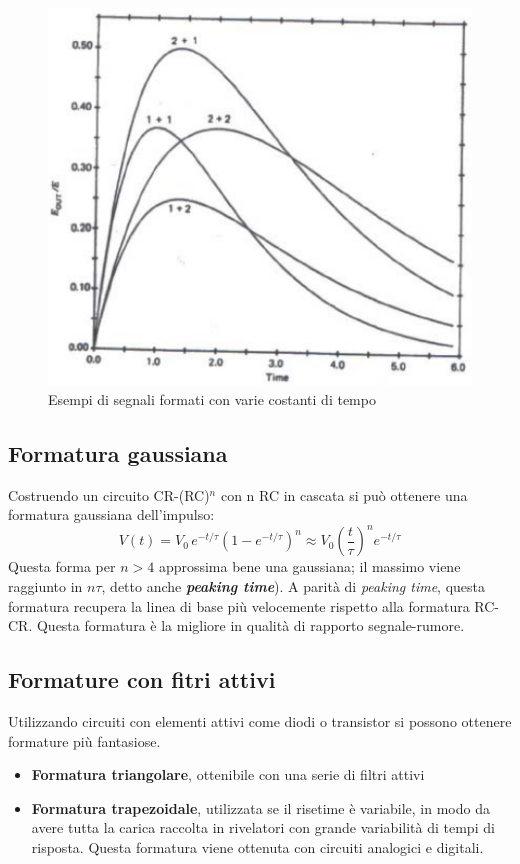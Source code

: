 \begin{figure}[htbp]
\begin{center}
\includegraphics[scale=1]{./Immagini/FormaturaRCCR.png}
\caption{Esempi di segnali formati con varie costanti di tempo}
\label{fig:formaturaRCCR}
\end{center}
\end{figure}
\subsection{Formatura gaussiana}
Costruendo un circuito CR-(RC)$^n$ con n RC in cascata si pu\`o ottenere una formatura gaussiana dell'impulso:
\begin{equation}
V(t) = V_0 \, e^{-t/\tau} (1-e^{-t/\tau})^n \approx V_0 \left(\frac{t}{\tau}\right)^n e^{-t/\tau}
\end{equation}
Questa forma per $n>4$ approssima bene una gaussiana;
il massimo viene raggiunto in $n\tau$, detto anche \textit{\textbf{peaking time}}).
A parit\`a di \textit{peaking time}, questa formatura recupera la linea di base pi\`u velocemente rispetto alla formatura RC-CR.
Questa formatura \`e la migliore in qualit\`a di rapporto segnale-rumore.
\subsection{Formature con fitri attivi}
Utilizzando circuiti con elementi attivi come diodi o transistor si possono ottenere formature pi\`u fantasiose.
\begin{itemize}
\item \textbf{Formatura triangolare}, ottenibile con una serie di filtri attivi
\item \textbf{Formatura trapezoidale}, utilizzata se il risetime \`e variabile, in modo da avere tutta la carica raccolta in rivelatori con grande variabilit\`a di tempi di risposta.
Questa formatura viene ottenuta con circuiti analogici e digitali.
\end{itemize}

